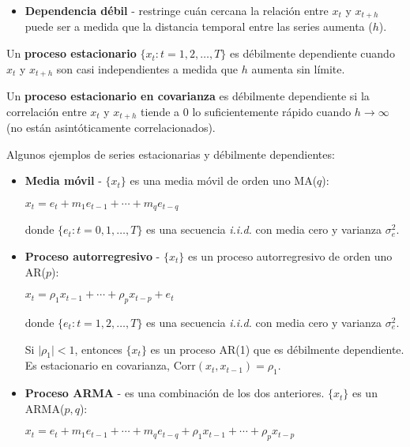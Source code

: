 \documentclass[10pt, a4paper, landscape]{extarticle}
\newcommand{\Corr}{\mathrm{Corr}}
\begin{document}
\begin{multicols}{3}
\begin{itemize}[leftmargin=*]
	\item \textbf{Dependencia débil} - restringe cuán cercana la relación entre $x_t$ y $x_{t+h}$ puede ser a medida que la distancia temporal entre las series aumenta ($h$).
\end{itemize}

Un \textbf{proceso estacionario} $\lbrace x_t : t = 1, 2, \ldots, T \rbrace$ es débilmente dependiente cuando $x_t$ y $x_{t + h}$ son casi independientes a medida que $h$ aumenta sin límite.

Un \textbf{proceso estacionario en covarianza} es débilmente dependiente si la correlación entre $x_t$ y $x_{t + h}$ tiende a $0$ lo suficientemente rápido cuando $h \rightarrow \infty$ (no están asintóticamente correlacionados).

Algunos ejemplos de series estacionarias y débilmente dependientes:

\begin{itemize}[leftmargin=*]
	\item \textbf{Media móvil} - $\lbrace x_t \rbrace$ es una media móvil de orden uno MA($q$):
	\begin{center}
		$x_t = e_t + m_1 e_{t - 1} + \cdots + m_q e_{t - q}$
	\end{center}
	donde $\lbrace e_t : t = 0, 1, \ldots, T \rbrace$ es una secuencia \textsl{i.i.d.} con media cero y varianza $\sigma^2_e$.
	\item \textbf{Proceso autorregresivo} - $\lbrace x_t \rbrace$ es un proceso autorregresivo de orden uno AR($p$):
	\begin{center}
		$x_t = \rho_1 x_{t - 1} + \cdots + \rho_p x_{t - p} + e_t$
	\end{center}
	donde $\lbrace e_t: t = 1, 2, \ldots, T \rbrace$ es una secuencia \textsl{i.i.d.} con media cero y varianza $\sigma^2_e$.

	Si $\lvert \rho_1 \rvert < 1$, entonces $\lbrace x_t \rbrace$ es un proceso AR(1) que es débilmente dependiente. Es estacionario en covarianza, $\Corr(x_t, x_{t - 1}) = \rho_1$.
	\item \textbf{Proceso ARMA} - es una combinación de los dos anteriores. $\lbrace x_t \rbrace$ es un ARMA($p, q$):
	\begin{center}
		$x_t = e_t + m_1 e_{t - 1} + \cdots + m_q e_{t - q} + \rho_1 x_{t - 1} + \cdots + \rho_p x_{t - p}$
	\end{center}
\end{itemize}


\end{multicols}
\end{document}
